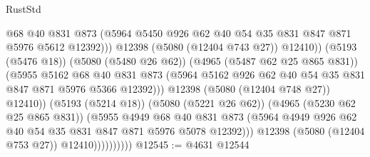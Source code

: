 \begin{lexlean}{RustStd}
\begin{coremodule}
                                        @68
                                        @40
                                        @831
                                        @873
                                        (@5964
                                          @5450
                                          @926
                                          @62
                                          @40
                                          @54
                                          @35
                                          @831
                                          @847
                                          @871
                                          @5976
                                          @5612
                                          @12392)))
                                    @12398
                                    (@5080 (@12404 @743 @27))
                                    @12410))
                                (@5193 (@5476 @18))
                                (@5080 (@5480 @26 @62))
                                (@4965 (@5487 @62 @25 @865 @831))
                                (@5955
                                  @5162
                                  @68
                                  @40
                                  @831
                                  @873
                                  (@5964
                                    @5162
                                    @926
                                    @62
                                    @40
                                    @54
                                    @35
                                    @831
                                    @847
                                    @871
                                    @5976
                                    @5366
                                    @12392)))
                              @12398
                              (@5080 (@12404 @748 @27))
                              @12410))
                          (@5193 (@5214 @18))
                          (@5080 (@5221 @26 @62))
                          (@4965 (@5230 @62 @25 @865 @831))
                          (@5955
                            @4949
                            @68
                            @40
                            @831
                            @873
                            (@5964 @4949 @926 @62 @40 @54 @35 @831 @847 @871 @5976 @5078 @12392)))
                        @12398
                        (@5080 (@12404 @753 @27))
                        @12410))))))))))
@12545 := @4631 @12544

\end{coremodule}
\end{lexlean}
